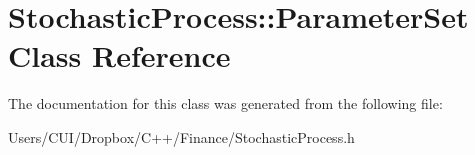 \hypertarget{class_stochastic_process_1_1_parameter_set}{}\section{Stochastic\+Process\+:\+:Parameter\+Set Class Reference}
\label{class_stochastic_process_1_1_parameter_set}


The documentation for this class was generated from the following file\+:\begin{DoxyCompactItemize}
\item 
Users/\+C\+U\+I/\+Dropbox/\+C++/\+Finance/Stochastic\+Process.\+h\end{DoxyCompactItemize}
